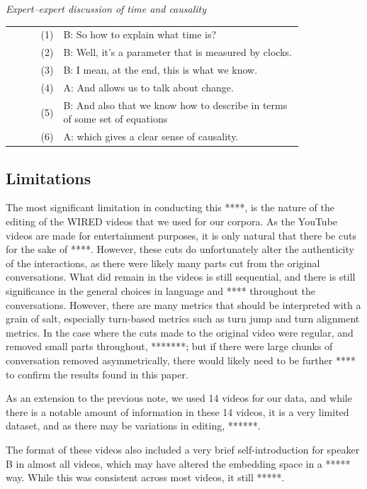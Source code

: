 \documentclass{article}
\makeatletter
\theoremstyle{definition}
\newcounter{excerpt}
\newenvironment{excerpt}[1][]
  {\refstepcounter{excerpt}\par\medskip\noindent\textit{#1}\par\smallskip
   \begin{tabular}{@{}r@{\quad}p{0.82\linewidth}@{}}}
  {\end{tabular}\par\medskip}
\numberwithin{table}{section}
\makeatother
\begin{document}
\begin{excerpt}[Expert--expert discussion of time and causality]\footnotemark
\label{ex:expert_expert_time}
(1)  & B: So how to explain what time is? \\
(2)  & B: Well, it's a parameter that is measured by clocks. \\
(3)  & B: I mean, at the end, this is what we know. \\
(4)  & A: And allows us to talk about change. \\
(5)  & B: And also that we know how to describe in terms of some set of equations \\
(6)  & A: which gives a clear sense of causality. \\
\end{excerpt}





\subsection{Limitations}

The most significant limitation in conducting this ****, is the nature of the editing of the WIRED videos that we used for our corpora. As the YouTube videos are made for entertainment purposes, it is only natural that there be cuts for the sake of ****. 
However, these cuts do unfortunately alter the authenticity of the interactions, as there were likely many parts cut from the original conversations. What did remain in the videos is still sequential, and there is still significance in the general choices in language and **** throughout the conversations. However, there are many metrics that should be interpreted with a grain of salt, especially turn-based metrics such as turn jump and turn alignment metrics. 
In the case where the cuts made to the original video were regular, and removed small parts throughout, *******; but if there were large chunks of conversation removed asymmetrically, there would likely need to be further **** to confirm the results found in this paper. 

As an extension to the previous note, we used 14 videos for our data, and while there is a notable amount of information in these 14 videos, it is a very limited dataset, and as there may be variations in editing, ******. 

The format of these videos also included a very brief self-introduction for speaker B in almost all videos, which may have altered the embedding space in a ***** way. While this was consistent across most videos, it still *****. 
\end{document}
